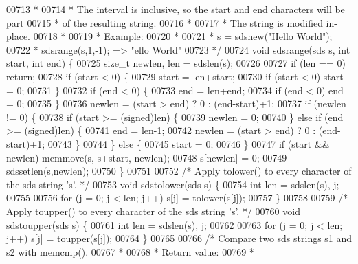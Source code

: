 \begin{DoxyCode}
{{{{{{{{{{{{{00713 \textcolor{comment}{ *}
00714 \textcolor{comment}{ * The interval is inclusive, so the start and end characters will be part}
00715 \textcolor{comment}{ * of the resulting string.}
00716 \textcolor{comment}{ *}
00717 \textcolor{comment}{ * The string is modified in-place.}
00718 \textcolor{comment}{ *}
00719 \textcolor{comment}{ * Example:}
00720 \textcolor{comment}{ *}
00721 \textcolor{comment}{ * s = sdsnew("Hello World");}
00722 \textcolor{comment}{ * sdsrange(s,1,-1); => "ello World"}
00723 \textcolor{comment}{ */}
00724 \textcolor{keywordtype}{void} sdsrange(sds s, \textcolor{keywordtype}{int} start, \textcolor{keywordtype}{int} end) \{
00725     size\_t newlen, len = sdslen(s);
00726 
00727     \textcolor{keywordflow}{if} (len == 0) \textcolor{keywordflow}{return};
00728     \textcolor{keywordflow}{if} (start < 0) \{
00729         start = len+start;
00730         \textcolor{keywordflow}{if} (start < 0) start = 0;
00731     \}
00732     \textcolor{keywordflow}{if} (end < 0) \{
00733         end = len+end;
00734         \textcolor{keywordflow}{if} (end < 0) end = 0;
00735     \}
00736     newlen = (start > end) ? 0 : (end-start)+1;
00737     \textcolor{keywordflow}{if} (newlen != 0) \{
00738         \textcolor{keywordflow}{if} (start >= (\textcolor{keywordtype}{signed})len) \{
00739             newlen = 0;
00740         \} \textcolor{keywordflow}{else} \textcolor{keywordflow}{if} (end >= (\textcolor{keywordtype}{signed})len) \{
00741             end = len-1;
00742             newlen = (start > end) ? 0 : (end-start)+1;
00743         \}
00744     \} \textcolor{keywordflow}{else} \{
00745         start = 0;
00746     \}
00747     \textcolor{keywordflow}{if} (start && newlen) memmove(s, s+start, newlen);
00748     s[newlen] = 0;
00749     sdssetlen(s,newlen);
00750 \}
00751 
00752 \textcolor{comment}{/* Apply tolower() to every character of the sds string 's'. */}
00753 \textcolor{keywordtype}{void} sdstolower(sds s) \{
00754     \textcolor{keywordtype}{int} len = sdslen(s), j;
00755 
00756     \textcolor{keywordflow}{for} (j = 0; j < len; j++) s[j] = tolower(s[j]);
00757 \}
00758 
00759 \textcolor{comment}{/* Apply toupper() to every character of the sds string 's'. */}
00760 \textcolor{keywordtype}{void} sdstoupper(sds s) \{
00761     \textcolor{keywordtype}{int} len = sdslen(s), j;
00762 
00763     \textcolor{keywordflow}{for} (j = 0; j < len; j++) s[j] = toupper(s[j]);
00764 \}
00765 
00766 \textcolor{comment}{/* Compare two sds strings s1 and s2 with memcmp().}
00767 \textcolor{comment}{ *}
00768 \textcolor{comment}{ * Return value:}
00769 \textcolor{comment}{ *}
}}}}}}}}}}}}}
\end{DoxyCode}
